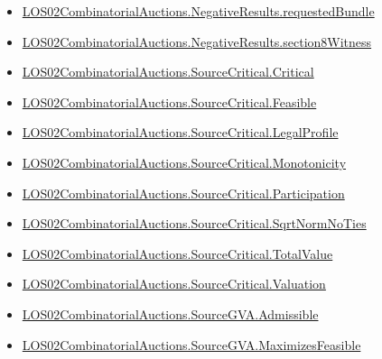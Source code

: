\documentclass[10pt]{article}
\begin{document}
\begin{itemize}[leftmargin=1.2em]
\begin{itemize}[leftmargin=1.2em]
\item \hyperlink{paper-prerequisite-5fde831afc0da9c9}{LOS02\allowbreak{}Combinatorial\allowbreak{}Auctions.\allowbreak{}Negative\allowbreak{}Results.\allowbreak{}requested\allowbreak{}Bundle}
\item \hyperlink{paper-prerequisite-6ed4f04140569096}{LOS02\allowbreak{}Combinatorial\allowbreak{}Auctions.\allowbreak{}Negative\allowbreak{}Results.\allowbreak{}section8\allowbreak{}Witness}
\item \hyperlink{paper-prerequisite-0fd988639267650e}{LOS02\allowbreak{}Combinatorial\allowbreak{}Auctions.\allowbreak{}Source\allowbreak{}Critical.\allowbreak{}Critical}
\item \hyperlink{paper-prerequisite-c3b8b148c971ce66}{LOS02\allowbreak{}Combinatorial\allowbreak{}Auctions.\allowbreak{}Source\allowbreak{}Critical.\allowbreak{}Feasible}
\item \hyperlink{paper-prerequisite-1004d1cac266ec58}{LOS02\allowbreak{}Combinatorial\allowbreak{}Auctions.\allowbreak{}Source\allowbreak{}Critical.\allowbreak{}Legal\allowbreak{}Profile}
\item \hyperlink{paper-prerequisite-358eb1efce1f44f1}{LOS02\allowbreak{}Combinatorial\allowbreak{}Auctions.\allowbreak{}Source\allowbreak{}Critical.\allowbreak{}Monotonicity}
\item \hyperlink{paper-prerequisite-308c55c442d0f9c2}{LOS02\allowbreak{}Combinatorial\allowbreak{}Auctions.\allowbreak{}Source\allowbreak{}Critical.\allowbreak{}Participation}
\item \hyperlink{paper-prerequisite-5b4a6cab608c3ed3}{LOS02\allowbreak{}Combinatorial\allowbreak{}Auctions.\allowbreak{}Source\allowbreak{}Critical.\allowbreak{}Sqrt\allowbreak{}Norm\allowbreak{}No\allowbreak{}Ties}
\item \hyperlink{paper-prerequisite-d77d3ad8ee382167}{LOS02\allowbreak{}Combinatorial\allowbreak{}Auctions.\allowbreak{}Source\allowbreak{}Critical.\allowbreak{}Total\allowbreak{}Value}
\item \hyperlink{paper-prerequisite-3e9f98e226155700}{LOS02\allowbreak{}Combinatorial\allowbreak{}Auctions.\allowbreak{}Source\allowbreak{}Critical.\allowbreak{}Valuation}
\item \hyperlink{paper-prerequisite-df925f549d7597b2}{LOS02\allowbreak{}Combinatorial\allowbreak{}Auctions.\allowbreak{}Source\allowbreak{}GVA.\allowbreak{}Admissible}
\item \hyperlink{paper-prerequisite-d1d83a8f0c72b260}{LOS02\allowbreak{}Combinatorial\allowbreak{}Auctions.\allowbreak{}Source\allowbreak{}GVA.\allowbreak{}Maximizes\allowbreak{}Feasible}

\end{itemize}
\end{itemize}
\end{document}
